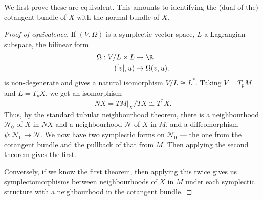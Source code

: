 \documentclass[a4paper]{article}
\begin{document}
We first prove these are equivalent. This amounts to identifying the (dual of the) cotangent bundle of $X$ with the normal bundle of $X$.

\begin{proof}[Proof of equivalence]
  If $(V, \Omega)$ is a symplectic vector space, $L$ a Lagrangian subspace, the bilinear form
  \begin{align*}
    \Omega: V/L \times L &\to \R\\
    ([v], u) &\to \Omega(v, u).
  \end{align*}
  is non-degenerate and gives a natural isomorphism $V/L \cong L^*$. Taking $V = T_p M$ and $L = T_p X$, we get an isomorphism
  \[
    NX = TM|_X /TX \cong T^* X.
  \]
  Thus, by the standard tubular neighbourhood theorem, there is a neighbourhood $\mathcal{N}_0$ of $X$ in $NX$ and a neighbourhood $\mathcal{N}$ of $X$ in $M$, and a diffeomorphism $\psi: \mathcal{N}_0 \to \mathcal{N}$. We now have two symplectic forms on $\mathcal{N}_0$ --- the one from the cotangent bundle and the pullback of that from $M$. Then applying the second theorem gives the first.

  Conversely, if we know the first theorem, then applying this twice gives us symplectomorphisms between neighbourhoods of $X$ in $M$ under each symplectic structure with a neighbourhood in the cotangent bundle.
\end{proof}
\end{document}
